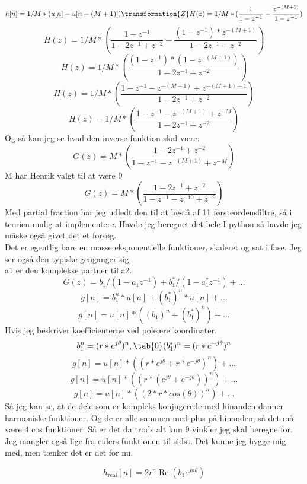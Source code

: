 \begin{Øvelser}
\begin{kapitel}[Z domænet]
\begin{Øvelse}
            \[h[n] = 1/M * (u[n] - u[n - (M+1)]) \transformation{Z} H(z) = 1/M * (\frac{1}{1 - z^{-1}} - \frac{z^{-(M+1)}}{1 - z^{-1}})\]
            \[H(z) = 1/M * (\frac{1 - z^{-1}}{1 - 2z^{-1} + z^{-2}} - \frac{(1 - z^{-1})*z^{-(M+1)}}{1 - 2z^{-1} + z^{-2}})\]
            \[H(z) = 1/M * (\frac{(1 - z^{-1}) * (1 - z^{-(M+1)})}{1 - 2z^{-1} + z^{-2}} )\]
            \[H(z) = 1/M * (\frac{1 - z^{-1} - z^{-(M+1)} + z^{-(M+1)-1}}{1 - 2z^{-1} + z^{-2}})\]
            \[H(z) = 1/M * (\frac{1 - z^{-1} - z^{-(M+1)} + z^{-M}}{1 - 2z^{-1} + z^{-2}})\]
            Og så kan jeg se hvad den inverse funktion skal være: 
            \[G(z) = M * (\frac{1 - 2z^{-1} + z^{-2}}{1 - z^{-1} - z^{-(M+1)} + z^{-M}})\]
            M har Henrik valgt til at være 9
            \[G(z) = M * (\frac{1 - 2z^{-1} + z^{-2}}{1 - z^{-1} - z^{-10} + z^{-9}})\]
            Med partial fraction har jeg udledt den til at bestå af 11 førsteordensfiltre, så i teorien mulig at implementere. 
            Havde jeg beregnet det hele I python så havde jeg måske også givet det et forsøg. 
             \\
            Det er egentlig bare en masse eksponentielle funktioner, skaleret og sat i fase.
            Jeg ser også den typiske genganger sig. \\
            a1 er den komplekse partner til a2.
            \[G(z) = b_1/(1 - a_1z^{-1}) + b_1^{*}/(1 - a_1^{*} z^{-1}) + ...\]
            \[g[n] = b_1^n * u[n] + (b_1^*)^n * u[n] + ...\]
            \[g[n] = u[n] * ((b_1)^n + (b_1^*)^n) + ...\]
            Hvis jeg beskriver koefficienterne ved poleære koordinater. 
            \[b_1^n = (r*e^{j\theta})^n, \tab{0} (b_1^*)^n = (r*e^{-j\theta})^n \]
            \[g[n] = u[n] * ((r*e^{j\theta} + r*e^{-j\theta})^n) + ...\]
            \[g[n] = u[n] * ((r*(e^{j\theta} + e^{-j\theta}))^n) + ...\]
            \[g[n] = u[n] * ((2*r*cos(\theta))^n) + ...\]
            Så jeg kan se, at de dele som er kompleks konjugerede med hinanden danner harmoniske funktioner. 
            Og de er alle sammen med plus på hinanden, så det må være 4 cos funktioner. 
            Så er det da trods alt kun 9 vinkler jeg skal beregne for. Jeg mangler også lige fra eulers funktionen til sidst.
            Det kunne jeg hygge mig med, men tænker det er det for nu.






            
            \clearpage\[
                h_{\text{real}}[n] = 2 r^n \operatorname{Re}(b_1 e^{j n\theta})
            \]




\end{Øvelse}
\end{kapitel}
\end{Øvelser}
